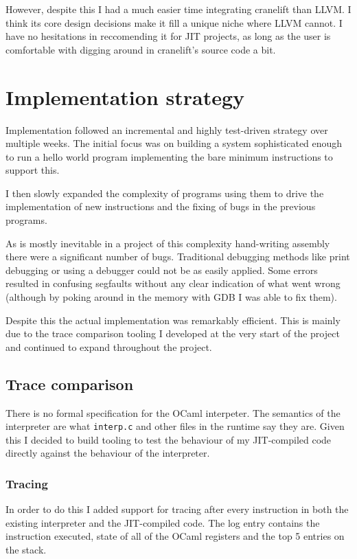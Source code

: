 However, despite this I had a much easier time integrating cranelift than LLVM. I think its core
design decisions make it fill a unique niche where LLVM cannot. I have no hesitations in
reccomending it for JIT projects, as long as the user is comfortable with digging around in
cranelift's source code a bit.

\section{Implementation strategy} \label{impl-strategy}

Implementation followed an incremental and highly test-driven strategy over multiple weeks. The
initial focus was on building a system sophisticated enough to run a hello world program
implementing the bare minimum instructions to support this.

I then slowly expanded the complexity of programs using them to drive the implementation of new
instructions and the fixing of bugs in the previous programs.

As is mostly inevitable in a project of this complexity hand-writing assembly there were a
significant number of bugs. Traditional debugging methods like print debugging or using a debugger
could not be as easily applied. Some errors resulted in confusing segfaults without any clear
indication
of what went wrong (although by poking around in the memory with GDB I was able to fix them).

Despite this the actual implementation was remarkably efficient. This is mainly due to the trace
comparison tooling I developed at the very start of the project and continued to expand throughout
the project.

\subsection{Trace comparison} \label{tracing}

There is no formal specification for the OCaml interpeter. The semantics of the interpreter are
what
\texttt{interp.c} and other files in the runtime say they are. Given this I decided to build
tooling to test the behaviour of my JIT-compiled code directly against the behaviour of the
interpreter.

\subsubsection{Tracing}

In order to do this I added support for tracing after every instruction in both the existing
interpreter and the JIT-compiled code. The log entry contains the instruction executed, state of
all of the OCaml registers and the top 5 entries on the stack.


